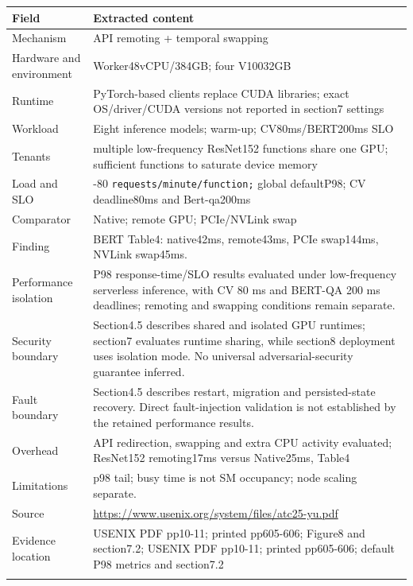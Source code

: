 \cite{P012}

\begin{longtable}{>{\raggedright\arraybackslash}p{}>{\raggedright\arraybackslash}p{}}
\toprule
\textbf{Field} & \textbf{Extracted content}\\\midrule\endhead
Mechanism & API remoting + temporal swapping\\\addlinespace
Hardware and environment & Worker48vCPU/384GB; four V10032GB\\\addlinespace
Runtime & PyTorch-based clients replace CUDA libraries; exact OS/driver/CUDA versions not reported in section7 settings\\\addlinespace
Workload & Eight inference models; warm-up; CV80ms/BERT200ms SLO\\\addlinespace
Tenants & multiple low-frequency ResNet152 functions share one GPU; sufficient functions to saturate device memory\\\addlinespace
Load and SLO & 10-80 \nolinkurl{requests/minute/function;} global defaultP98; CV deadline80ms and Bert-qa200ms\\\addlinespace
Comparator & Native; remote GPU; PCIe/NVLink swap\\\addlinespace
Finding & BERT Table4: native42ms, remote43ms, PCIe swap144ms, NVLink swap45ms.\\\addlinespace
Performance isolation & P98 response-time/SLO results evaluated under low-frequency serverless inference, with CV 80 ms and BERT-QA 200 ms deadlines; remoting and swapping conditions remain separate.\\\addlinespace
Security boundary & Section4.5 describes shared and isolated GPU runtimes; section7 evaluates runtime sharing, while section8 deployment uses isolation mode. No universal adversarial-security guarantee inferred.\\\addlinespace
Fault boundary & Section4.5 describes restart, migration and persisted-state recovery. Direct fault-injection validation is not established by the retained performance results.\\\addlinespace
Overhead & API redirection, swapping and extra CPU activity evaluated; ResNet152 remoting17ms versus Native25ms, Table4\\\addlinespace
Limitations & p98 tail; busy time is not SM occupancy; node scaling separate.\\\addlinespace
Source & \url{https://www.usenix.org/system/files/atc25-yu.pdf}\\\addlinespace
Evidence location & USENIX PDF pp10-11; printed pp605-606; Figure8 and section7.2; USENIX PDF pp10-11; printed pp605-606; default P98 metrics and section7.2\\\addlinespace
\bottomrule\end{longtable}

